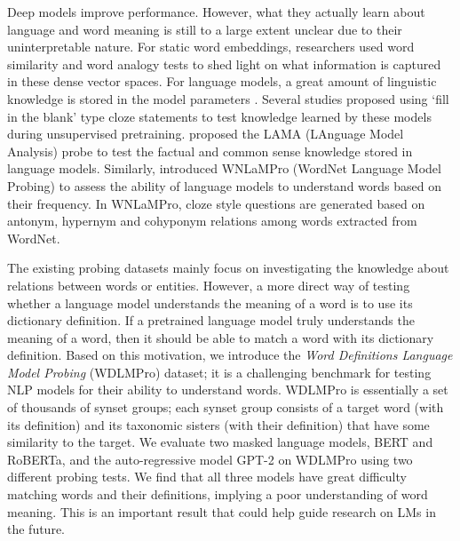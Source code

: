 \documentclass[11pt,a4paper]{article}
\begin{document}

Deep models improve performance. However,
what they actually learn about language and word meaning  is
still to a large extent unclear due to their uninterpretable
nature. For static word embeddings, researchers used word
similarity \cite{hill15simlex} and word analogy
\cite{gladkova16analogy} tests to shed light on what
information is captured in these dense vector spaces. For
language models, a great amount of linguistic knowledge is
stored in the model parameters \cite{peters18dissecting}.
Several studies proposed using `fill in the blank' type
cloze statements to test  knowledge learned by these models
during unsupervised pretraining. 
proposed the LAMA (LAnguage Model Analysis) probe to test
the factual and common sense knowledge stored in  language
models.
Similarly, \citet{Schick20rareWords} introduced WNLaMPro
(WordNet Language Model Probing)  to assess the ability of
language models to understand words based on their
frequency. In WNLaMPro, cloze style questions are generated
based on antonym, hypernym and cohyponym relations among
words extracted from WordNet.


The existing probing datasets mainly focus on investigating
the knowledge about relations between words or
entities. However, a more direct way of testing whether a
language model understands the meaning of a word is to
use its dictionary definition. If a pretrained
language model truly understands the meaning of a word, then
it should be able to
match a word with its dictionary definition. 
Based on this motivation, we introduce the \textit{Word Definitions Language
  Model Probing} (WDLMPro) dataset; it is a challenging
benchmark for testing NLP models for their ability to
understand words.
WDLMPro is essentially a set of
thousands of synset groups; each synset group consists
of a target word (with its definition) and its taxonomic sisters
(with their definition) that have some similarity to the target.
We evaluate two masked language models, BERT and
RoBERTa, and the auto-regressive model GPT-2 on WDLMPro using two different probing tests.
We find that all three models have great difficulty matching
words and their definitions, implying a poor understanding
of word meaning.
This is an important result that could
help guide research on LMs in the future.
\end{document}
